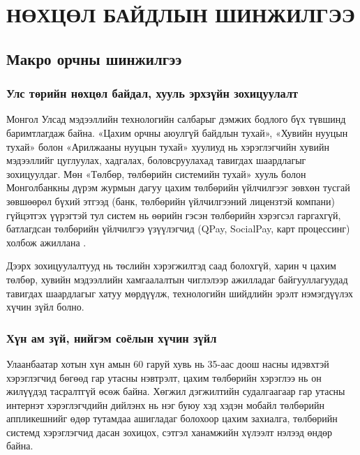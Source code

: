 \chapter{НӨХЦӨЛ БАЙДЛЫН ШИНЖИЛГЭЭ}

\section{Макро орчны шинжилгээ}

\subsection{Улс төрийн нөхцөл байдал, хууль эрхзүйн зохицуулалт}

Монгол Улсад мэдээллийн технологийн салбарыг дэмжих бодлого бүх түвшинд
баримтлагдаж байна. «Цахим орчны аюулгүй байдлын тухай», «Хувийн нууцын
тухай» болон «Арилжааны нууцын тухай» хуулиуд нь хэрэглэгчийн хувийн
мэдээллийг цуглуулах, хадгалах, боловсруулахад тавигдах шаардлагыг
зохицуулдаг. Мөн «Төлбөр, төлбөрийн системийн тухай» хууль болон Монголбанкны
дүрэм журмын дагуу цахим төлбөрийн үйлчилгээг зөвхөн тусгай зөвшөөрөл
бүхий этгээд (банк, төлбөрийн үйлчилгээний лицензтэй компани) гүйцэтгэх
үүрэгтэй тул систем нь өөрийн гэсэн төлбөрийн хэрэгсэл гаргахгүй,
батлагдсан төлбөрийн үйлчилгээ үзүүлэгчид (QPay, SocialPay, карт
процессинг) холбож ажиллана \cite{privacylaw}.

Дээрх зохицуулалтууд нь төслийн хэрэгжилтэд саад болохгүй, харин ч
цахим төлбөр, хувийн мэдээллийн хамгаалалтын чиглэлээр ажилладаг
байгууллагуудад тавигдах шаардлагыг хатуу мөрдүүлж, технологийн
шийдлийн эрэлт нэмэгдүүлэх хүчин зүйл болно.

\subsection{Хүн ам зүй, нийгэм соёлын хүчин зүйл}

Улаанбаатар хотын хүн амын 60 гаруй хувь нь 35-аас доош насны
идэвхтэй хэрэглэгчид бөгөөд гар утасны нэвтрэлт, цахим төлбөрийн
хэрэглээ нь он жилүүдэд тасралтгүй өсөж байна. Хөгжил дэгжилтийн
судалгаагаар гар утасны интернэт хэрэглэгчдийн дийлэнх нь нэг буюу
хэд хэдэн мобайл төлбөрийн аппликешнийг өдөр тутамдаа ашигладаг болохоор
цахим захиалга, төлбөрийн системд хэрэглэгчид дасан зохицох,
сэтгэл ханамжийн хүлээлт нэлээд өндөр байна.

